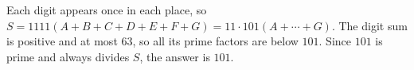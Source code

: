 Each digit appears once in each place, so $S=1111(A+B+C+D+E+F+G)=11\cdot101(A+\cdots+G)$. The digit sum is positive and at most $63$, so all its prime factors are below $101$. Since $101$ is prime and always divides $S$, the answer is $\boxed{101}$.
